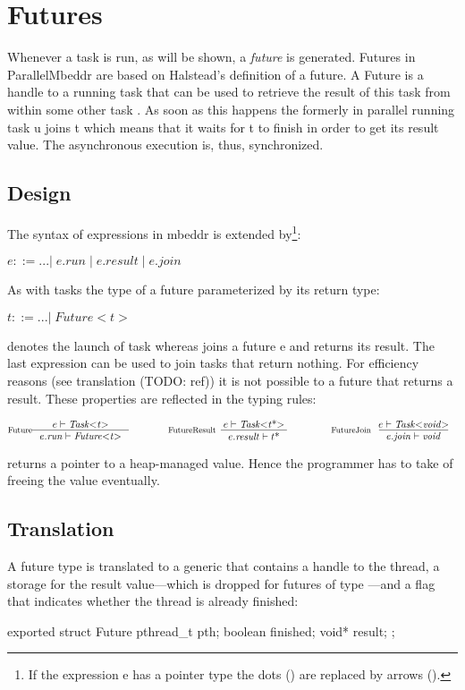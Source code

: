 \section{Futures}
Whenever a task  is run, as will be shown, a \textit{future} is generated. Futures in ParallelMbeddr are based on Halstead's definition of a future\cite{Halstead_Multilisp}. A Future is a handle to a running task that can be used to retrieve the result of this task from within some other task . As soon as this happens the formerly in parallel running task u joins t which means that it waits for t to finish in order to get its result value. The asynchronous execution is, thus, synchronized.

\subsection{Design}
The syntax of expressions in mbeddr is extended by\footnote{If the expression e has a pointer type the dots () are replaced by arrows (\CODE{->}).}:

$ e ::= ...|\;e.\mathit{run}\;|\;e.\mathit{result}\;|\;e.\mathit{join} $

As with tasks the type of a future parameterized by its return type:

$ t ::= ...|\;\mathit{Future{<}t{>}}$

 denotes the launch of task  whereas  joins a future {e} and returns its result. The last expression  can be used to join tasks that return nothing. For efficiency reasons (see translation (TODO: ref)) it is not possible to  a future that returns a result. These properties are reflected in the typing rules:

\begin{center}
\begin{align*}
\inference*[Future]{e |- \mathit{Task{<}t{>}}}{e.\mathit{run} |- \mathit{Future{<}t{>}}}
\qquad\qquad
\inference*[FutureResult]{e |- \mathit{Task{<}t\text{*}{>}}}{e.\mathit{result} |- t\text{*}}
\qquad\qquad
\inference*[FutureJoin]{e |- \mathit{Task{<}void{>}}}{e.\mathit{join} |- \mathit{void}}
\end{align*}
\end{center}

 returns a pointer to a heap-managed value. Hence the programmer has to take of freeing the value eventually.

\subsection{Translation}
A future type  is translated to a generic  that contains a handle to the thread, a storage for the result value---which is dropped for futures of type ---and a flag that indicates whether the thread is already finished:
\begin{ccode}
exported struct Future { 
  pthread_t pth; 
  boolean finished; 
  void* result; 
};
\end{ccode}

